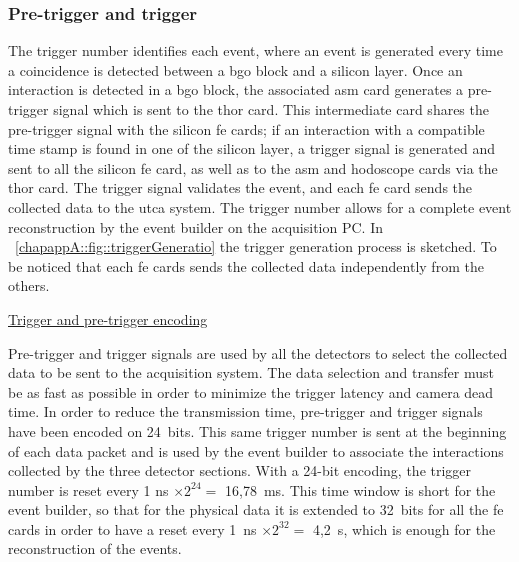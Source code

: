 
\subsubsection{Pre-trigger and trigger}\label{chapappA::subsubsec::trigger}

The trigger number identifies each event, where an event is generated every time a coincidence is detected between a \gls{bgo} block and a silicon layer. Once an interaction is detected in a \gls{bgo} block, the associated \gls{asm} card generates a pre-trigger signal which is sent to the \gls{thor} card. This intermediate card shares the pre-trigger signal with the silicon \gls{fe} cards; if an interaction with a compatible time stamp is found in one of the silicon layer, a trigger signal is generated and sent to all the silicon \gls{fe} card, as well as to the \gls{asm} and hodoscope cards via the \gls{thor} card. The trigger signal validates the event, and each \gls{fe} card sends the collected data to the \gls{utca} system. The trigger number allows for a complete event reconstruction by the event builder on the acquisition PC. In \figurename~\ref{chapappA::fig::triggerGeneratio} the trigger generation process is sketched.\newline
To be noticed that each \gls{fe} cards sends the collected data independently from the others.\newline


\underline{Trigger and pre-trigger encoding}\newline

Pre-trigger and trigger signals are used by all the detectors to select the collected data to be sent to the acquisition system. The data selection and transfer must be as fast as possible in order to minimize the trigger latency and camera dead time. In order to reduce the transmission time, pre-trigger and trigger signals have been encoded on 24~bits.\newline
This same trigger number is sent at the beginning of each data packet and is used by the event builder to associate the interactions collected by the three detector sections. With a 24-bit encoding, the trigger number is reset every 1 ns $\times \mathrm{2^{24}} =$ 16,78~ms. This time window is short for the event builder, so that for the physical data it is extended to 32~bits for all the \gls{fe} cards in order to have a reset every 1~ns $\times \mathrm{2^{32}} =$ 4,2~s, which is enough for the reconstruction of the events.


